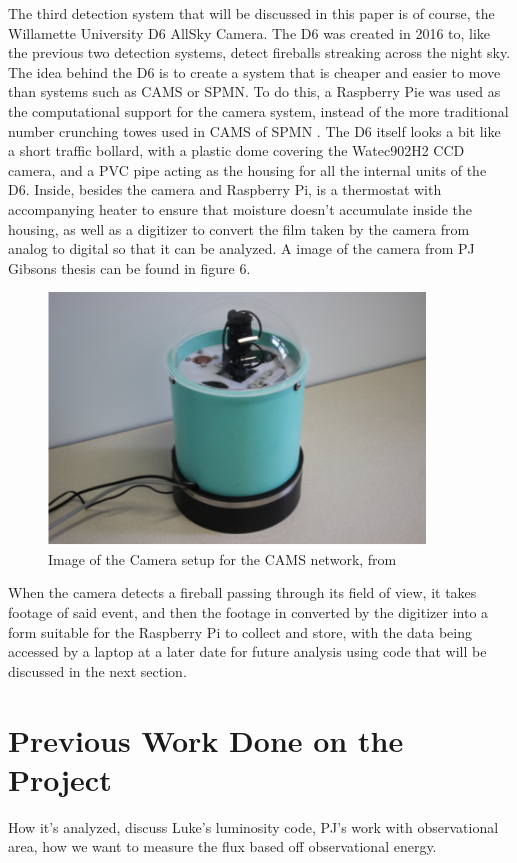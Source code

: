 The third detection system that will be discussed in this paper is of course, the Willamette University D6 AllSky Camera. 
The D6 was created in 2016 to, like the previous two detection systems, detect fireballs streaking across the night sky.
The idea behind the D6 is to create a system that is cheaper and easier to move than systems such as CAMS or SPMN. 
To do this, a Raspberry Pie was used as the computational support for the camera system, instead of the more traditional number crunching towes used in CAMS of SPMN \cite{McSwain}.
The D6 itself looks a bit like a short traffic bollard, with a plastic dome covering the Watec902H2 CCD camera, and a PVC pipe acting as the housing for all the internal units of the D6.
Inside, besides the camera and Raspberry Pi, is a thermostat with accompanying heater to ensure that moisture doesn't accumulate inside the housing, as well as a digitizer to convert the film taken by the camera from analog to digital so that it can be analyzed. A image of the camera from PJ Gibsons thesis can be found in figure 6.

\begin{figure}
    \centering
    \includegraphics[width=10cm]{D6-Camera.png}
    \caption{Image of the Camera setup for the CAMS network, from \cite{Gibson}}
    \label{Figure 6}
\end{figure}

When the camera detects a fireball passing through its field of view, it takes footage of said event, and then the footage in converted by the digitizer into a form suitable for the Raspberry Pi to collect and store, with the data being accessed by a laptop at a later date for future analysis using code that will be discussed in the next section.

\section{Previous Work Done on the Project}

How it's analyzed, discuss Luke's luminosity code, PJ's work with observational area, how we want to measure the flux based off observational energy.